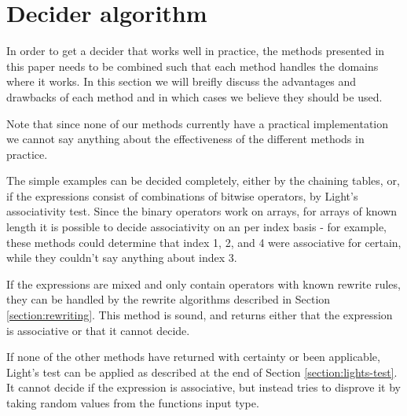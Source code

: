 \section{Decider algorithm}
In order to get a decider that works well in practice, the methods presented in this paper
needs to be combined such that each method handles the domains where it works. In this
section we will breifly discuss the advantages and drawbacks of each method and in which
cases we believe they should be used.

Note that since none of our methods currently have a practical implementation we cannot
say anything about the effectiveness of the different methods in practice.

The simple examples can be decided completely, either by the chaining tables, or, if the
expressions consist of combinations of bitwise operators, by Light's associativity test.
Since the binary operators work on arrays, for arrays of known length it is possible to
decide associativity on an per index basis - for example, these methods could determine
that index 1, 2, and 4 were associative for certain, while they couldn't say anything
about index 3.

If the expressions are mixed and only contain operators with known rewrite rules, they can
be handled by the rewrite algorithms described in Section \ref{section:rewriting}. This
method is sound, and returns either that the expression is associative or that it cannot
decide.

If none of the other methods have returned with certainty or been applicable, Light's test
can be applied as described at the end of Section \ref{section:lights-test}. It cannot
decide if the expression is associative, but instead tries to disprove it by taking random
values from the functions input type. 
